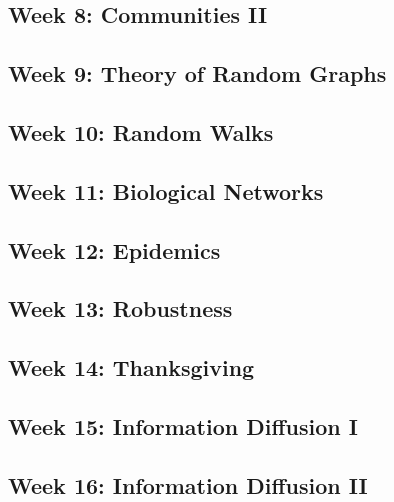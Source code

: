 \documentclass[11pt,article,oneside]{memoir}
\begin{document}
\subsection{Week 8:  Communities II}
\subsection{Week 9:  Theory of Random Graphs}
\subsection{Week 10: Random Walks}
\subsection{Week 11: Biological Networks}
\subsection{Week 12: Epidemics}
\subsection{Week 13: Robustness}
\subsection{Week 14: Thanksgiving}
\subsection{Week 15: Information Diffusion I}
\subsection{Week 16: Information Diffusion II}
\end{document}
